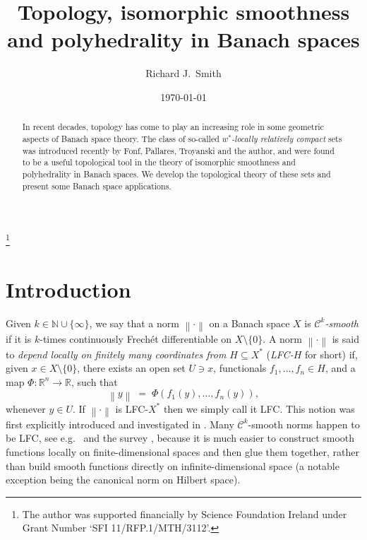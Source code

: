 \documentclass[12pt,reqno]{amsart}
\newcommand{\map}[3]{\ensuremath{{#1}:{#2}\to{#3}}}
\newcommand{\n}[1]{\ensuremath{\left\|{#1}\right\|}}
\newcommand{\N}{\mathbb{N}}
\newcommand{\ndot}{\ensuremath{\left\|\cdot\right\|}}
\newcommand{\oneton}[2]{\ensuremath{{#1}_1,\ldots,{#1}_{#2}}}
\newcommand{\R}{\mathbb{R}}
\theoremstyle{definition}
\begin{document}
\title[Topology, isomorphic smoothness and polyhedrality in Banach spaces]{Topology, isomorphic smoothness and polyhedrality in Banach spaces}
\begin{abstract}
In recent decades, topology has come to play an increasing role in some geometric aspects of Banach space theory. The class of so-called \emph{$w^*$-locally relatively compact} sets was introduced recently by Fonf, Pallares, Troyanski and the author, and were found to be a useful topological tool in the theory of isomorphic smoothness and polyhedrality in Banach spaces. We develop the topological theory of these sets and present some Banach space applications.
\end{abstract}

\author{Richard J.~Smith}
\address{School of Mathematics and Statistics, University College Dublin, Belfield, Dublin 4, Ireland}

\thanks{The author was supported financially by Science Foundation Ireland under Grant Number `SFI 11/RFP.1/MTH/3112'.}

\date{\today}
\maketitle

\section{Introduction}\label{sect_introduction}

Given $k \in \N \cup \{\infty\}$, we say that a norm $\ndot$ on a Banach space $X$ is {\em $\mathscr{C}^k$-smooth} if it is $k$-times continuously Frech\'et differentiable on $X\setminus\{0\}$. A norm $\ndot$ is said to {\em depend locally on finitely many coordinates from $H \subseteq X^*$} ({\em LFC-$H$} for short) if, given $x \in X\setminus\{0\}$, there exists an open set $U \ni x$, functionals $\oneton{f}{n} \in H$, and a map $\map{\Phi}{\R^n}{\R}$, such that
\[
\n{y} \;=\; \Phi(f_1(y),\dots, f_n(y)),
\]
whenever $y \in U$. If $\ndot$ is LFC-$X^*$ then we simply call it LFC. This notion was first explicitly introduced and investigated in \cite{pwz:81}. Many $\mathscr{C}^k$-smooth norms happen to be LFC, see e.g.\ \cite{hajek:95,hh:07} and the survey \cite{hz:06}, because it is much easier to construct smooth functions locally on finite-dimensional spaces and then glue them together, rather than build smooth functions directly on infinite-dimensional space (a notable exception being the canonical norm on Hilbert space).
\end{document}
